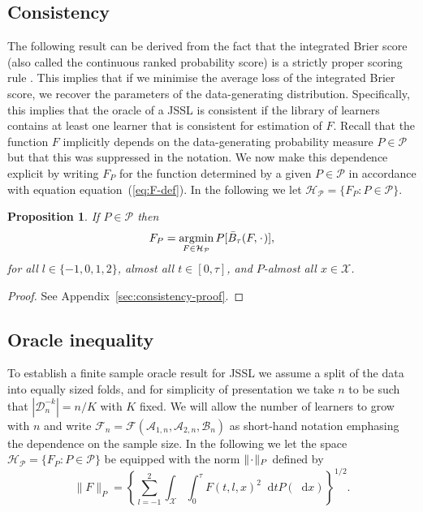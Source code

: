 \documentclass[a4paper,danish]{article}
\theoremstyle{plain} %
\numberwithin{theorem}{section}
\newtheorem{proposition}[theorem]{Proposition}
\theoremstyle{definition} %
\theoremstyle{remark}
\DeclareMathOperator{\E}{\mathbb{E}} %
\newcommand{\blank}{\makebox[1ex]{\textbf{$\cdot$}}}
\newcommand*\diff{\mathop{}\!\mathrm{d}}
\newcommand{\1}{\mathds{1}}
\DeclareMathOperator*{\argmin}{\arg\!\min}
\newcommand{\data}{\ensuremath{\mathcal{D}}}
\begin{document}
\subsection{Consistency}
\label{sec:consistency}

The following result can be derived from the fact
that the integrated Brier score (also called the continuous
ranked probability score) is a strictly proper scoring rule
\citep{gneiting2007strictly}. This implies that if we minimise
the average loss of the integrated Brier score, we recover the
parameters of the data-generating distribution. Specifically,
this implies that the oracle of a JSSL is consistent
if the library of learners contains at least one learner that
is consistent for estimation of \( F \). Recall that the
function \(F\) implicitly depends on the data-generating
probability measure \(P\in\mathcal P\) but that this was
suppressed in the notation. We now make this dependence
explicit by writing \(F_P\) for the function determined by a
given \(P \in\mathcal{P}\) in accordance with equation
equation~(\ref{eq:F-def}). In the following we let
\( \mathcal{H}_{\mathcal{P}} = \{F_P : P \in \mathcal{P}\} \).

\begin{proposition}
  \label{prop:stric-prop}
  If \(P \in\mathcal{P}\) then
  \begin{equation*}
    F_P = \argmin_{F \in \mathcal{H}_{\mathcal{P}}} P{[\bar{B}_\tau(F, \blank)]},
  \end{equation*}
  for all \( l \in \{-1, 0, 1, 2 \} \), almost all
  \( t \in [0,\tau] \), and \( P \)-almost all
  \( x \in \mathcal{X} \).
\end{proposition}
\begin{proof}
  See Appendix~\ref{sec:consistency-proof}.
\end{proof}

\subsection{Oracle inequality}
\label{sec:finite-sample-oracle}

To establish a finite sample oracle result for JSSL we
assume a split of the data into equally sized folds, and for
simplicity of presentation we take \( n \) to be such that \(
|\data_n^{-k}| = n/K \) with \( K \) fixed. We will allow the number
of learners to grow with \( n \) and write \(
\mathcal{F}_n=\mathcal{F}(\mathcal{A}_{1,n}, \mathcal{A}_{2,n},
\mathcal{B}_n)\) as short-hand notation emphasing the
dependence on the sample size. In the following we let the space \(
\mathcal{H}_{\mathcal{P}}= \{F_P : P \in \mathcal{P}\} \) be equipped with the norm \( \| \blank
\|_{P} \) defined by
\begin{equation}
  \label{eq:norm}
  \| F \|_{P} = 
  \left\{
    \sum_{l=-1}^{2}\int_{\mathcal{X}} \int_0^{\tau} F(t, l, x)^2 \diff t P( \diff x)
  \right\}^{1/2}.
\end{equation}
\end{document}
